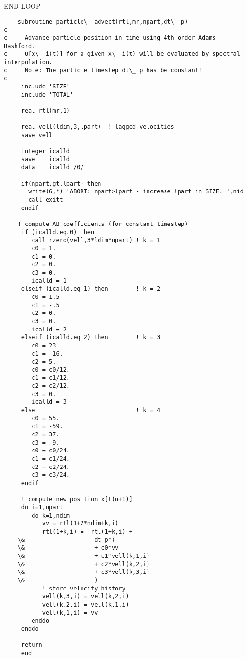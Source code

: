 END LOOP

\begin{verbatim}
    subroutine particle\_ advect(rtl,mr,npart,dt\_ p)
c     
c     Advance particle position in time using 4th-order Adams-Bashford.
c     U[x\_ i(t)] for a given x\_ i(t) will be evaluated by spectral interpolation.
c     Note: The particle timestep dt\_ p has be constant!
c
     include 'SIZE'
     include 'TOTAL'
        
     real rtl(mr,1)
         
     real vell(ldim,3,lpart)  ! lagged velocities 
     save vell
        
     integer icalld
     save    icalld
     data    icalld /0/
        
     if(npart.gt.lpart) then
       write(6,*) 'ABORT: npart>lpart - increase lpart in SIZE. ',nid
       call exitt
     endif 
        
    ! compute AB coefficients (for constant timestep)
     if (icalld.eq.0) then
        call rzero(vell,3*ldim*npart) ! k = 1 
        c0 = 1.
        c1 = 0.
        c2 = 0.
        c3 = 0.                       
        icalld = 1
     elseif (icalld.eq.1) then        ! k = 2
        c0 = 1.5
        c1 = -.5
        c2 = 0.
        c3 = 0.
        icalld = 2
     elseif (icalld.eq.2) then        ! k = 3
        c0 = 23.
        c1 = -16.
        c2 = 5.
        c0 = c0/12.
        c1 = c1/12.
        c2 = c2/12.
        c3 = 0.
        icalld = 3
     else                             ! k = 4
        c0 = 55.
        c1 = -59.
        c2 = 37.
        c3 = -9.
        c0 = c0/24.
        c1 = c1/24.
        c2 = c2/24.
        c3 = c3/24.
     endif

     ! compute new position x[t(n+1)]
     do i=1,npart
        do k=1,ndim
           vv = rtl(1+2*ndim+k,i)
           rtl(1+k,i) =  rtl(1+k,i) +
    \&                    dt_p*(
    \&                    + c0*vv
    \&                    + c1*vell(k,1,i)
    \&                    + c2*vell(k,2,i)
    \&                    + c3*vell(k,3,i)
    \&                    )
           ! store velocity history 
           vell(k,3,i) = vell(k,2,i)
           vell(k,2,i) = vell(k,1,i)
           vell(k,1,i) = vv
        enddo
     enddo

     return
     end
  \end{verbatim}  